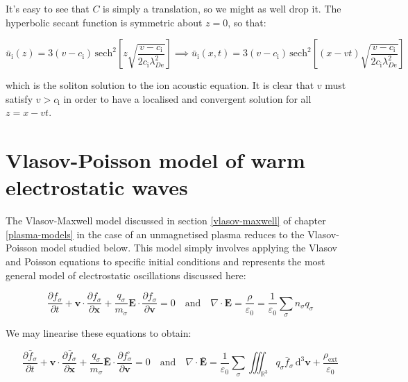 It's easy to see that $C$ is simply a translation, so we might as well drop it. The hyperbolic secant function is symmetric about $z=0$, so that:

\begin{equation}
    \bar{u}_\mathrm{i}(z)=3(v-c_\mathrm{i})\,\mathrm{sech}^2\left[z\sqrt{\frac{v-c_\mathrm{i}}{2c_\mathrm{i}\lambda_{D\text{e}}^2}}\right]\implies
    \bar{u}_\mathrm{i}(x,t)=3(v-c_\mathrm{i})\,\mathrm{sech}^2\left[(x-vt)\sqrt{\frac{v-c_\mathrm{i}}{2c_\mathrm{i}\lambda_{D\text{e}}^2}}\right]
\end{equation}

which is the soliton solution to the ion acoustic equation. It is clear that $v$ must satisfy $v>c_\mathrm{i}$ in order to have a localised and convergent solution for all $z=x-vt$.

\section{Vlasov-Poisson model of warm electrostatic waves}

The Vlasov-Maxwell model discussed in section \ref{vlasov-maxwell} of chapter \ref{plasma-models} in the case of an unmagnetised plasma reduces to the Vlasov-Poisson model studied below. This model simply involves applying the Vlasov and Poisson equations to specific initial conditions and represents the most general model of electrostatic oscillations discussed here:

\begin{equation}
    \frac{\partial f_\sigma}{\partial t}+\mathbf{v}\cdot\frac{\partial f_\sigma}{\partial\mathbf{x}}+\frac{q_\sigma}{m_\sigma}\mathbf{E}\cdot\frac{\partial f_\sigma}{\partial\mathbf{v}}=0\quad\text{and}\quad\nabla\cdot\mathbf{E}=\frac{\rho}{\varepsilon_0}=\frac{1}{\varepsilon_0}\sum_{\sigma}n_\sigma q_\sigma
\end{equation}

We may linearise these equations to obtain:

\begin{equation}
    \frac{\partial\bar{f}_\sigma}{\partial t}+\mathbf{v}\cdot\frac{\partial\bar{f}_\sigma}{\partial\mathbf{x}}+\frac{q_\sigma}{m_\sigma}\bar{\mathbf{E}}\cdot\frac{\partial f_\sigma^\square}{\partial\mathbf{v}}=0\quad\text{and}\quad\nabla\cdot\bar{\mathbf{E}}=\frac{1}{\varepsilon_0}\sum_{\sigma}\iiint_{\mathbb{R}^3}q_\sigma\bar{f}_\sigma\,\mathrm{d}^3\mathbf{v}+\frac{\rho_\text{ext}}{\varepsilon_0}
\end{equation}

